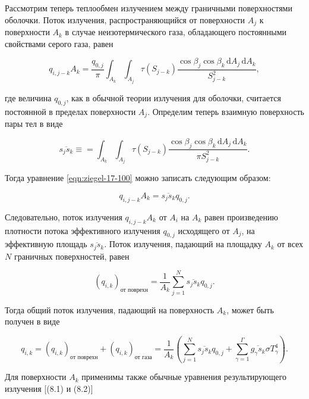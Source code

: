 Рассмотрим теперь теплообмен излучением между граничными
поверхностями оболочки. Поток излучения, распространяющийся
от поверхности $A_j$ к поверхности $A_k$ в случае неизотермического
газа, обладающего постоянными свойствами серого газа, равен

\begin{equation}
	\label{eqn:ziegel-17-100}
	q_{i, j-k} A_k = \frac{q_{0, j}}{\pi} \int_{A_k} \int_{A_j} \tau (S_{j - k})
	\frac{\cos{\beta_j} \cos{\beta_k} \, \mathrm dA_j \, \mathrm dA_k}{S^2_{j-k}},
\end{equation}

\noindent где величина $q_{0, j}$, как в обычной теории излучения для оболочки,
считается постоянной в пределах поверхности $A_j$. Определим
теперь взаимную поверхность пары тел в виде

\begin{equation}
	\overline{s_j s_k} \equiv = \int_{A_k} \int_{A_j} \tau (S_{j - k})
	\frac{\cos{\beta_j} \cos{\beta_k} \, \mathrm dA_j \, \mathrm dA_k}{\pi S^2_{j-k}}.
\end{equation}

\noindent Тогда уравнение \eqref{eqn:ziegel-17-100} можно записать следующим образом:

\begin{equation}
	q_{i, j-k} A_k = \overline{s_j s_k} q_{0, j}.
\end{equation}

\noindent Следовательно, поток излучения $q_{i, j-k}A_k$ от $A_i$ на $A_k$ равен
произведению плотности потока эффективного излучения $q_{0, j}$
исходящего от $A_j$, на эффективную площадь $\overline{s_j s_k}$. Поток излучения,
падающий на площадку $A_k$ от всех $N$ граничных поверхностей, равен

\begin{equation}
	(q_{i, k})_{\text{от поврехн}} = \frac{1}{A_k} \sum_{j=1}^{N} \overline{s_j s_k} q_{0, j}.
\end{equation}

Тогда общий поток излучения, падающий на поверхность $A_k$,
может быть получен в виде

\begin{equation}
	\label{eqn:ziegel-17-104}
	q_{i, k} = (q_{i, k})_{\text{от поврехн}} + (q_{i, k})_{\text{от газа}} =
	\frac{1}{A_k} \left( \sum_{j=1}^{N} \overline{s_js_k}q_{0, j} + \sum_{\gamma=1}^{\Gamma} \overline{g_\gamma s_k}\sigma T^4_\gamma \right).
\end{equation}

\noindent Для поверхности $A_k$ применимы также обычные уравнения
результирующего излучения [(8.1) и (8.2)]

